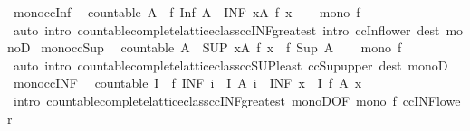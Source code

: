 \begin{isabellebody}
\isanewline
\isanewline
{}\isamarkupfalse%
\ mono{\isacharunderscore}ccInf{\isacharcolon}\isanewline
\ \ {\isachardoublequoteopen}countable\ A\ {\isasymLongrightarrow}\ f\ {\isacharparenleft}Inf\ A{\isacharparenright}\ {\isasymle}\ {\isacharparenleft}INF\ x{\isacharcolon}A{\isachardot}\ f\ x{\isacharparenright}{\isachardoublequoteclose}\isanewline
%
\isadelimproof
\ \ %
\endisadelimproof
%
\isatagproof
{}\isamarkupfalse%
\ {\isacartoucheopen}mono\ f{\isacartoucheclose}\isanewline
\ \ \isamarkupfalse%
\ {\isacharparenleft}auto\ intro{\isacharbang}{\isacharcolon}\ countable{\isacharunderscore}complete{\isacharunderscore}lattice{\isacharunderscore}class{\isachardot}ccINF{\isacharunderscore}greatest\ intro{\isacharcolon}\ ccInf{\isacharunderscore}lower\ dest{\isacharcolon}\ monoD{\isacharparenright}%
\endisatagproof
{\isafoldproof}%
%
\isadelimproof
\isanewline
%
\endisadelimproof
\isanewline
{}\isamarkupfalse%
\ mono{\isacharunderscore}ccSup{\isacharcolon}\isanewline
\ \ {\isachardoublequoteopen}countable\ A\ {\isasymLongrightarrow}\ {\isacharparenleft}SUP\ x{\isacharcolon}A{\isachardot}\ f\ x{\isacharparenright}\ {\isasymle}\ f\ {\isacharparenleft}Sup\ A{\isacharparenright}{\isachardoublequoteclose}\isanewline
%
\isadelimproof
\ \ %
\endisadelimproof
%
\isatagproof
{}\isamarkupfalse%
\ {\isacartoucheopen}mono\ f{\isacartoucheclose}\ \isamarkupfalse%
\ {\isacharparenleft}auto\ intro{\isacharcolon}\ countable{\isacharunderscore}complete{\isacharunderscore}lattice{\isacharunderscore}class{\isachardot}ccSUP{\isacharunderscore}least\ ccSup{\isacharunderscore}upper\ dest{\isacharcolon}\ monoD{\isacharparenright}%
\endisatagproof
{\isafoldproof}%
%
\isadelimproof
\isanewline
%
\endisadelimproof
\isanewline
{}\isamarkupfalse%
\ mono{\isacharunderscore}ccINF{\isacharcolon}\isanewline
\ \ {\isachardoublequoteopen}countable\ I\ {\isasymLongrightarrow}\ f\ {\isacharparenleft}INF\ i\ {\isacharcolon}\ I{\isachardot}\ A\ i{\isacharparenright}\ {\isasymle}\ {\isacharparenleft}INF\ x\ {\isacharcolon}\ I{\isachardot}\ f\ {\isacharparenleft}A\ x{\isacharparenright}{\isacharparenright}{\isachardoublequoteclose}\isanewline
%
\isadelimproof
\ \ %
\endisadelimproof
%
\isatagproof
{}\isamarkupfalse%
\ {\isacharparenleft}intro\ countable{\isacharunderscore}complete{\isacharunderscore}lattice{\isacharunderscore}class{\isachardot}ccINF{\isacharunderscore}greatest\ monoD{\isacharbrackleft}OF\ {\isacartoucheopen}mono\ f{\isacartoucheclose}{\isacharbrackright}\ ccINF{\isacharunderscore}lower{\isacharparenright}%

\end{isabellebody}
